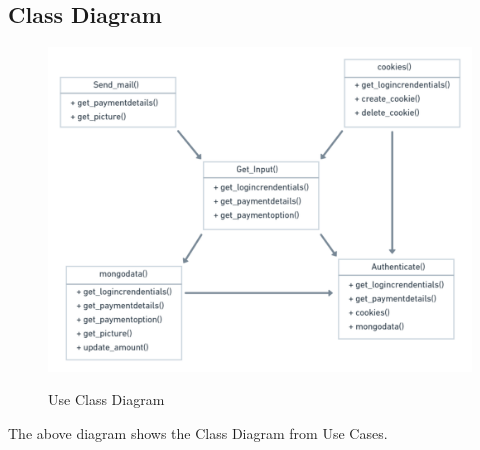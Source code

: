 \documentclass[12pt, oneside, a4paper]{article}
\begin{document}
\subsection{Class Diagram}


\begin{figure}[H]
\begin{center}
\includegraphics[width=1\textwidth]{Classes.png}\\
\caption{Use Class Diagram}
\label{fig:Figure 4}
\end{center}
\end{figure}

\begin{center}
The above diagram shows the Class Diagram from Use Cases.
\end{center}

\pagebreak
\end{document}

